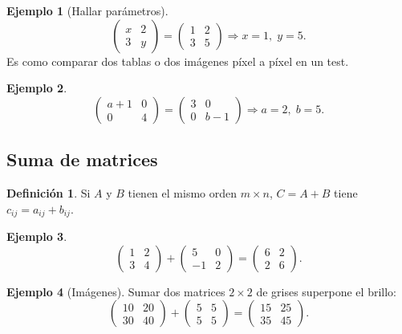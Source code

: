 \documentclass[a4paper,12pt]{article}
\theoremstyle{definition}
\newtheorem{definicion}{Definición}[section]
\newtheorem{ejemplo}{Ejemplo}[section]
\begin{document}
\begin{ejemplo}[Hallar parámetros]
\[
\begin{pmatrix} x & 2 \\ 3 & y \end{pmatrix} = \begin{pmatrix} 1 & 2 \\ 3 & 5 \end{pmatrix} \Rightarrow x=1,\; y=5.
\]
Es como comparar dos tablas o dos imágenes píxel a píxel en un test.
\end{ejemplo}

\begin{ejemplo}
\[
\begin{pmatrix} a+1 & 0 \\ 0 & 4 \end{pmatrix} = \begin{pmatrix} 3 & 0 \\ 0 & b-1 \end{pmatrix} \Rightarrow a=2,\; b=5.
\]
\end{ejemplo}

\subsection{Suma de matrices}
\begin{definicion}
Si $A$ y $B$ tienen el mismo orden $m \times n$, $C=A+B$ tiene $c_{ij}=a_{ij}+b_{ij}$.
\end{definicion}

\begin{ejemplo}
\[
\begin{pmatrix} 1 & 2 \\ 3 & 4 \end{pmatrix} + \begin{pmatrix} 5 & 0 \\ -1 & 2 \end{pmatrix} = \begin{pmatrix} 6 & 2 \\ 2 & 6 \end{pmatrix}.
\]
\end{ejemplo}

\begin{ejemplo}[Imágenes]
Sumar dos matrices $2 \times 2$ de grises superpone el brillo:
\[
\begin{pmatrix} 10 & 20 \\ 30 & 40 \end{pmatrix} + \begin{pmatrix} 5 & 5 \\ 5 & 5 \end{pmatrix} = \begin{pmatrix} 15 & 25 \\ 35 & 45 \end{pmatrix}.
\]
\end{ejemplo}
\end{document}
